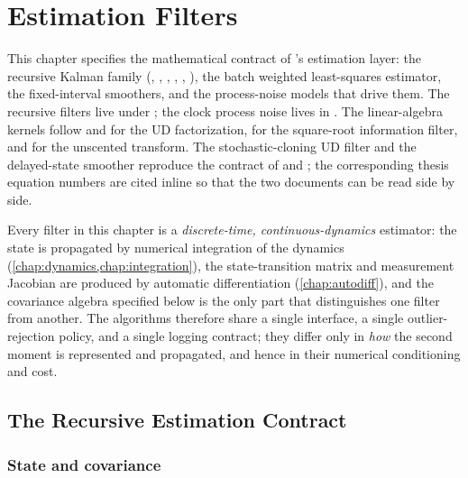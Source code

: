 \chapter{Estimation Filters}
\label{chap:filters}

This chapter specifies the mathematical contract of \lupnt{}'s estimation
layer: the recursive Kalman family (, , ,
, , ), the batch
weighted least-squares estimator, the fixed-interval smoothers, and the
process-noise models that drive them. The recursive filters live under
; the clock process noise lives in
. The linear-algebra kernels follow
\citet{bierman1977} and \citet{thornton1980} for the UD factorization,
\citet{tapley2004} for the square-root information filter, and
\citet{julier2004ukf} for the unscented transform. The stochastic-cloning UD
filter and the delayed-state smoother reproduce the contract of
\citep[Ch.~6.2]{iiyama2026thesis} and \citep{iiyama2026scud}; the corresponding
thesis equation numbers are cited inline so that the two documents can be read
side by side.

Every filter in this chapter is a \emph{discrete-time, continuous-dynamics}
estimator: the state is propagated by numerical integration of the dynamics
(\cref{chap:dynamics,chap:integration}), the state-transition matrix and
measurement Jacobian are produced by automatic differentiation
(\cref{chap:autodiff}), and the covariance algebra specified below is the only
part that distinguishes one filter from another. The algorithms therefore share
a single interface, a single outlier-rejection policy, and a single logging
contract; they differ only in \emph{how} the second moment is represented and
propagated, and hence in their numerical conditioning and cost.

\section{The Recursive Estimation Contract}
\label{sec:flt-contract}

\subsection{State and covariance}

